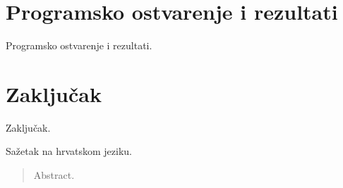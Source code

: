 \documentclass[times, utf8, zavrsni]{fer}
\begin{document}
\chapter{Programsko ostvarenje i rezultati}
Programsko ostvarenje i rezultati.

\chapter{Zaključak}
Zaključak.




\begin{sazetak}
Sažetak na hrvatskom jeziku.

\end{sazetak}
\begin{abstract}
Abstract.

\end{abstract}
\end{document}
